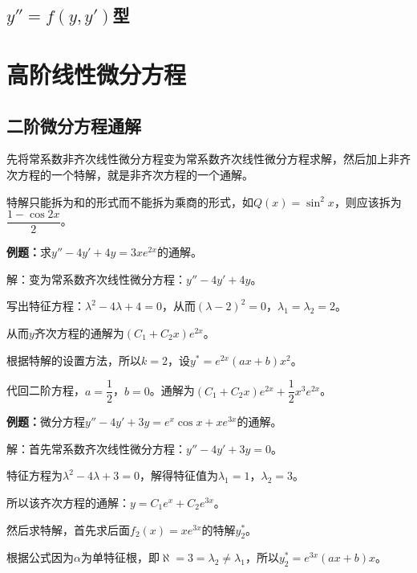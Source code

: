 \documentclass[UTF8, 12pt]{ctexart}
\begin{document}
\subsection{\texorpdfstring{$y''=f(y,y')$}\ 型}

\section{高阶线性微分方程}



\subsection{二阶微分方程通解}

先将常系数非齐次线性微分方程变为常系数齐次线性微分方程求解，然后加上非齐次方程的一个特解，就是非齐次方程的一个通解。

特解只能拆为和的形式而不能拆为乘商的形式，如$Q(x)=\sin^2x$，则应该拆为$\dfrac{1-\cos2x}{2}$。

\textbf{例题：}求$y''-4y'+4y=3xe^{2x}$的通解。

解：变为常系数齐次线性微分方程：$y''-4y'+4y$。

写出特征方程：$\lambda^2-4\lambda+4=0$，从而$(\lambda-2)^2=0$，$\lambda_1=\lambda_2=2$。

从而$y$齐次方程的通解为$(C_1+C_2x)e^{2x}$。

根据特解的设置方法，所以$k=2$，设$y^*=e^{2x}(ax+b)x^2$。

代回二阶方程，$a=\dfrac{1}{2}$，$b=0$。通解为$(C_1+C_2x)e^{2x}+\dfrac{1}{2}x^3e^{2x}$。

\textbf{例题：}微分方程$y''-4y'+3y=e^x\cos x+xe^{3x}$的通解。

解：首先常系数齐次线性微分方程：$y''-4y'+3y=0$。

特征方程为$\lambda^2-4\lambda+3=0$，解得特征值为$\lambda_1=1$，$\lambda_2=3$。

所以该齐次方程的通解：$y=C_1e^x+C_2e^{3x}$。

然后求特解，首先求后面$f_2(x)=xe^{3x}$的特解$y_2^*$。

根据公式因为$\alpha$为单特征根，即$\aleph=3=\lambda_2\neq\lambda_1$，所以$y_2^*=e^{3x}(ax+b)x$。
\end{document}
